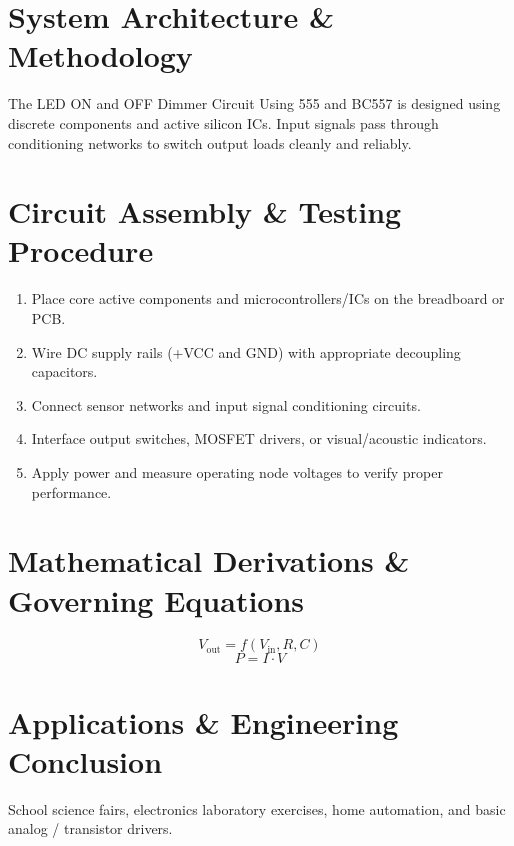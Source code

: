 \documentclass[11pt,a4paper]{article}
\begin{document}
\section{System Architecture \& Methodology}
The LED ON and OFF Dimmer Circuit Using 555 and BC557 is designed using discrete components and active silicon ICs. Input signals pass through conditioning networks to switch output loads cleanly and reliably.

\section{Circuit Assembly \& Testing Procedure}
\begin{enumerate}
    \item Place core active components and microcontrollers/ICs on the breadboard or PCB.
    \item Wire DC supply rails (+VCC and GND) with appropriate decoupling capacitors.
    \item Connect sensor networks and input signal conditioning circuits.
    \item Interface output switches, MOSFET drivers, or visual/acoustic indicators.
    \item Apply power and measure operating node voltages to verify proper performance.
\end{enumerate}

\section{Mathematical Derivations \& Governing Equations}
\begin{equation}
V_{\text{out}} = f(V_{\text{in}}, R, C)
\end{equation}
\begin{equation}
P = I \cdot V
\end{equation}

\section{Applications \& Engineering Conclusion}
School science fairs, electronics laboratory exercises, home automation, and basic analog / transistor drivers.
\end{document}
